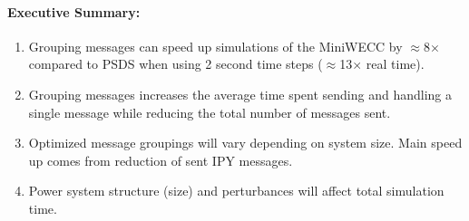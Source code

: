 \documentclass[12pt]{article}
\begin{document}
\paragraph{Executive Summary:} 
\begin{enumerate}
\item Grouping messages can speed up simulations of the MiniWECC by $\approx$8$\times$ compared to PSDS when using 2 second time steps ($\approx$13$\times$ real time).
\item Grouping messages increases the average time spent sending and handling a single message while reducing the total number of messages sent.
\item Optimized message groupings will vary depending on system size. Main speed up comes from reduction of sent IPY messages.
\item Power system structure (size) and perturbances will affect total simulation time.
\end{enumerate}
\end{document}
